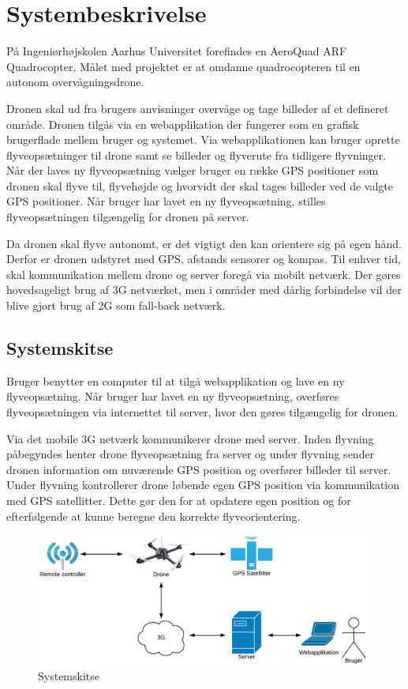 \chapter{Systembeskrivelse}
\vspace{-1cm}
På Ingeniørhøjskolen Aarhus Universitet forefindes en AeroQuad ARF Quadrocopter. 
Målet med projektet er at omdanne quadrocopteren til en autonom overvågningsdrone.

Dronen skal ud fra brugers anvisninger overvåge og tage billeder af et defineret område. 
Dronen tilgås via en webapplikation der fungerer som en grafisk brugerflade mellem bruger og systemet.  Via webapplikationen kan bruger oprette flyveopsætninger til drone samt se billeder og flyverute fra tidligere flyvninger.  
Når der laves ny flyveopsætning vælger bruger en række GPS positioner som dronen skal flyve til, flyvehøjde og hvorvidt der skal tages billeder ved de valgte GPS positioner. Når bruger har lavet en ny flyveopsætning, stilles flyveopsætningen tilgængelig for dronen på server.  

Da dronen skal flyve autonomt, er det vigtigt den kan orientere sig på egen hånd. Derfor er dronen udstyret med GPS, afstands sensorer og kompas.
Til enhver tid, skal kommunikation mellem drone og server foregå via mobilt netværk. Der gøres hovedsageligt brug af 3G netværket, men i områder med dårlig forbindelse vil der blive gjort brug af 2G som fall-back netværk. 

\vspace{-0.5cm}

\section*{Systemskitse}
\vspace{-0.5cm}
Bruger benytter en computer til at tilgå webapplikation og lave en ny flyveopsætning. Når bruger har lavet en ny flyveopsætning, overføres flyveopsætningen via internettet til server, hvor den gøres tilgængelig for dronen.
 
Via det mobile 3G netværk kommunikerer drone med server. 
Inden flyvning påbegyndes henter drone flyveopsætning fra server og under flyvning sender dronen information om nuværende GPS position og overfører billeder til server. 
Under flyvning kontrollerer drone løbende egen GPS position via kommunikation med GPS satellitter. Dette gør den for at opdatere egen position og for efterfølgende at kunne beregne den korrekte flyveorientering. 



\vspace{-5pt}
\begin{figure}[H]
\centering
\includegraphics[width=1\textwidth]{Billeder/Projektbeskrivelse.png}
\vspace{-.5cm}
\caption{Systemskitse}
\label{fig:Systemskitse}
\end{figure}